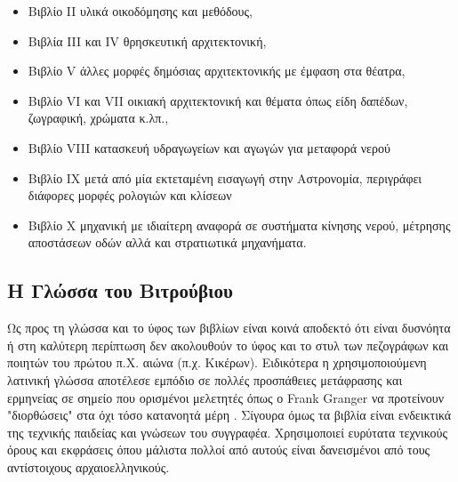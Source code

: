 \begin{itemize}[noitemsep]
\item Βιβλίο II υλικά οικοδόμησης και μεθόδους,
\item Βιβλία III και IV θρησκευτική αρχιτεκτονική,
\item Βιβλίο V άλλες μορφές δημόσιας αρχιτεκτονικής με έμφαση στα θέατρα,
\item Βιβλίο VI και VII οικιακή αρχιτεκτονική και θέματα όπως είδη δαπέδων, ζωγραφική, χρώματα κ.λπ.,
\item Βιβλίο VIII κατασκευή υδραγωγείων και αγωγών για μεταφορά νερού
\item Βιβλίο IX μετά από μία εκτεταμένη εισαγωγή στην Αστρονομία, περιγράφει διάφορες μορφές ρολογιών και κλίσεων
\item Βιβλίο X μηχανική με ιδιαίτερη αναφορά σε συστήματα κίνησης νερού, μέτρησης αποστάσεων οδών αλλά και στρατιωτικά μηχανήματα.
\end{itemize}

\subsection{Η Γλώσσα του Βιτρούβιου}

Ως προς τη γλώσσα και το ύφος των βιβλίων είναι κοινά αποδεκτό ότι είναι 
δυσνόητα ή στη καλύτερη περίπτωση δεν ακολουθούν το ύφος και το στυλ των 
πεζογράφων και ποιητών του πρώτου π.Χ. αιώνα (π.χ. Κικέρων). Ειδικότερα η 
χρησιμοποιούμενη λατινική γλώσσα αποτέλεσε εμπόδιο σε πολλές προσπάθειες 
μετάφρασης και ερμηνείας σε σημείο που ορισμένοι μελετητές όπως ο Frank Granger 
να προτείνουν "διορθώσεις" στα όχι τόσο κατανοητά μέρη  \cite[σ. 
19]{vitruvius-lefas}. Σίγουρα όμως τα βιβλία είναι ενδεικτικά της τεχνικής 
παιδείας και γνώσεων του συγγραφέα. Χρησιμοποιεί ευρύτατα τεχνικούς όρους και 
εκφράσεις όπου μάλιστα πολλοί από αυτούς είναι δανεισμένοι από τους 
αντίστοιχους αρχαιοελληνικούς.